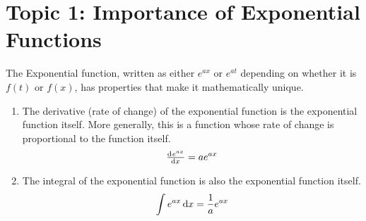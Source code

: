 \documentclass[../notes-main.tex]{subfiles}
\begin{document}
\section{Topic 1: Importance of Exponential Functions}
The Exponential function, written as either
\(e^{ax}\) or \(e^{at}\) depending on whether it is \(f(t)\) or \(f(x)\),
has properties that make it mathematically unique.
\begin{enumerate}
    \item The derivative (rate of change) of the exponential function is the exponential function itself. More generally, this is a function whose rate of change is proportional to the function itself.
          \begin{equation}
              \od{e^{ax}}{x} = ae^{ax}
              \label{eq:exp-deriv}
          \end{equation}
    \item The integral of the exponential function is also the exponential function itself.
          \begin{equation}
              \int e^{ax} \dif x = \frac{1}{a}e^{ax}
              \label{eq:exp-integral}
          \end{equation}
\end{enumerate}
\end{document}
